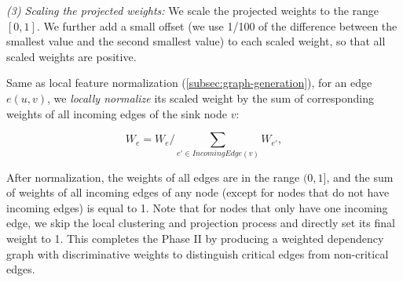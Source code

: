 \emph{(3) Scaling the projected weights:}
We scale the projected weights to the range $[0,1]$. We further add a small offset (we use 1/100 of the difference between the smallest value and the second smallest value) to each scaled weight, so that all scaled weights are positive.



Same as local feature normalization (\cref{subsec:graph-generation}), for an edge $e(u, v)$, we \emph{locally normalize} its scaled weight by the sum of corresponding weights of all incoming edges of the sink node $v$:

\begin{equation}
    \label{eq:local-weight-normalization}
    W_e = W_e/\sum_{e' \in IncomingEdge(v)} W_{e'},
\end{equation}

After normalization, the weights of all edges are in the range $(0, 1]$, and the sum of weights of all incoming edges of any node (except for nodes that do not have incoming edges) is equal to 1. 
Note that for nodes that only have one incoming edge, we skip the local clustering and projection process and directly set its final weight to 1.
This completes the Phase II by producing a weighted dependency graph with discriminative weights to distinguish critical edges from non-critical edges.




